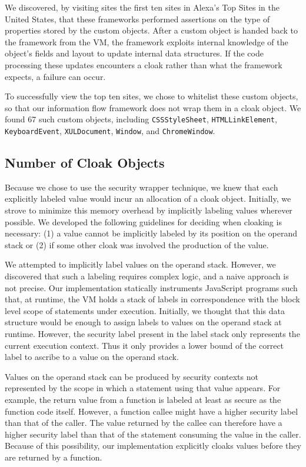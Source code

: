\documentclass[11pt,onecolumn]{article}
\begin{document}
We discovered, by visiting sites the first ten sites in Alexa's Top Sites in the United States\cite{alexa}, that these frameworks performed assertions on the type of properties stored by the custom objects.
After a custom object is handed back to the framework from the VM, 
the framework exploits internal knowledge of the object's fields and layout to update internal data structures.
If the code processing these updates encounters a cloak rather than what the framework expects, a failure can occur.

To successfully view the top ten sites, we chose to whitelist these custom objects, so that our information flow framework does not wrap them in a cloak object.
We found 67 such custom objects, including \texttt{CSSStyleSheet}, \texttt{HTMLLinkElement}, \texttt{KeyboardEvent}, \texttt{XULDocument}, \texttt{Window}, and \texttt{ChromeWindow}.


\subsection{Number of Cloak Objects}
Because we chose to use the security wrapper technique, we knew that each explicitly labeled value would incur an allocation of a cloak object. 
Initially, we strove to minimize this memory overhead by implicitly labeling values wherever possible.
We developed the following guidelines for deciding when cloaking is necessary: (1) a value cannot be implicitly labeled by its position on the operand stack or (2) if some other cloak was involved the production of the value.

We attempted to implicitly label values on the operand stack.
However, we discovered that such a labeling requires complex logic, and a naive approach is not precise.
Our implementation statically instruments JavaScript programs such that, at runtime, the VM holds a stack of labels in correspondence with the block level scope of statements under execution.
Initially, we thought that this data structure would be enough to assign labels to values on the operand stack at runtime.
However, the security label present in the label stack only represents the current execution context.
Thus it only provides a lower bound of the correct label to ascribe to a value on the operand stack.

Values on the operand stack can be produced by security contexts not represented by the scope in which a statement using that value appears.
For example, the return value from a function is labeled at least as secure as the function code itself.
However, a function callee might have a higher security label than that of the caller.
The value returned by the callee can therefore have a higher security label than that of the statement consuming the value in the caller.
Because of this possibility, our implementation explicitly cloaks values before they are returned by a function.
\end{document}
